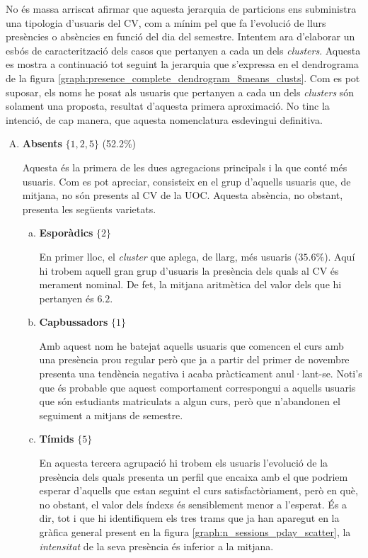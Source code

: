 \documentclass[
	a4paper,
	twoside,
	justified
]{tufte-book}
\begin{document}
No és massa arriscat afirmar que aquesta jerarquia de particions ens subministra una tipologia d'usuaris del CV, com a mínim pel que fa l'evolució de llurs presències o absències en funció del dia del semestre. Intentem ara d'elaborar un esbós de caracterització dels casos que pertanyen a cada un dels \emph{clusters}. Aquesta es mostra a continuació tot seguint la jerarquia que s'expressa en el dendrograma de la figura \ref{graph:presence_complete_dendrogram_8means_clusts}. Com es pot suposar, els noms he posat als usuaris que pertanyen a cada un dels \emph{clusters} són solament una proposta, resultat d'aquesta primera aproximació. No tinc la intenció, de cap manera, que aquesta nomenclatura esdevingui definitiva.

\begin{enumerate}[A.]
\item \textbf{Absents} $\{1,2,5\}$ (52.2\%)
	
	Aquesta és la primera de les dues agregacions principals i la que conté més usuaris. Com es pot apreciar, consisteix en el grup d'aquells usuaris que, de mitjana, no són presents al CV de la UOC. Aquesta absència, no obstant, presenta les següents varietats. 
	
	\begin{enumerate}[a.]
	\item \textbf{Esporàdics} $\{2\}$
	
	En primer lloc, el \emph{cluster} que aplega, de llarg, més usuaris ($35.6\%$). Aquí hi trobem aquell gran grup d'usuaris la presència dels quals al CV és merament nominal. De fet, la mitjana aritmètica del valor  dels que hi pertanyen és $6.2$.   
	
	\item \textbf{Capbussadors} $\{1\}$
	
	Amb aquest nom he batejat aquells usuaris que comencen el curs amb una presència prou regular però que ja a partir del primer de novembre presenta una tendència negativa i acaba pràcticament anul·lant-se. Noti's que és probable que aquest comportament correspongui a aquells usuaris que són estudiants matriculats a algun curs, però que n'abandonen el seguiment a mitjans de semestre.   
	
	\item \textbf{Tímids} $\{5\}$
	
	En aquesta tercera agrupació hi trobem els usuaris l'evolució de la presència dels quals presenta un perfil que encaixa amb el que podriem esperar d'aquells que estan seguint el curs satisfactòriament, però en què, no obstant, el valor dels índexs és sensiblement menor a l'esperat. És a dir, tot i que hi identifiquem els tres trams que ja han aparegut en la gràfica general present en la figura \ref{graph:n_sessions_pday_scatter}, la \emph{intensitat} de la seva presència és inferior a la mitjana.  
	

\end{enumerate}
\end{enumerate}
\end{document}
